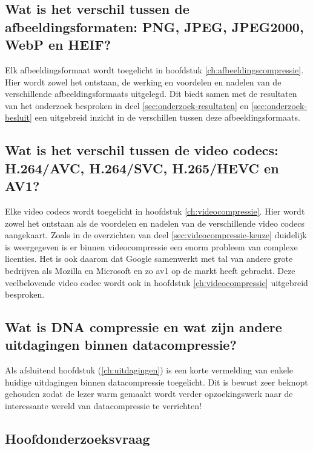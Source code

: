 \subsection*{Wat is het verschil tussen de afbeeldingsformaten: PNG, JPEG, JPEG2000, WebP en HEIF?}
\label{sec:onderzoeksvraag-5}

Elk \gls{afbeeldingsformaat} wordt toegelicht in hoofdstuk \ref{ch:afbeeldingscompressie}. Hier wordt zowel het ontstaan, de werking en voordelen en nadelen van de verschillende \glspl{afbeeldingsformaat} uitgelegd. Dit biedt samen met de resultaten van het onderzoek besproken in deel \ref{sec:onderzoek-resultaten} en \ref{sec:onderzoek-besluit} een uitgebreid inzicht in de verschillen tussen deze \glspl{afbeeldingsformaat}.

\subsection*{Wat is het verschil tussen de video codecs: H.264/AVC, H.264/SVC, H.265/HEVC en AV1?}
\label{sec:conclussie-onderzoeksvraag-6}

Elke video \glspl{codec} wordt toegelicht in hoofdstuk \ref{ch:videocompressie}. Hier wordt zowel het ontstaan als de voordelen en nadelen van de verschillende video \glspl{codec} aangekaart. Zoals in de overzichten van deel \ref{sec:videocompressie-keuze} duidelijk is weergegeven is er binnen \gls{videocompressie} een enorm probleem van complexe licenties. Het is ook daarom dat Google samenwerkt met tal van andere grote bedrijven als Mozilla en Microsoft en zo \gls{av1} op de markt heeft gebracht. Deze veelbelovende video \gls{codec} wordt ook in hoofdstuk \ref{ch:videocompressie} uitgebreid besproken.

\subsection*{Wat is DNA compressie en wat zijn andere uitdagingen binnen datacompressie?}
\label{sec:onderzoeksvraag-7}

Als afsluitend hoofdstuk (\ref{ch:uitdagingen}) is een korte vermelding van enkele huidige uitdagingen binnen \gls{datacompressie} toegelicht. Dit is bewust zeer beknopt gehouden zodat de lezer warm gemaakt wordt verder opzoekingswerk naar de interessante wereld van \gls{datacompressie} te verrichten!

\subsection{Hoofdonderzoeksvraag}
\label{sec:conclussie-hoofdonderzoeksvraag}

